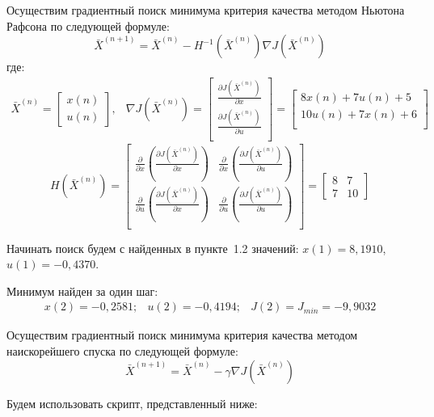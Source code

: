 \documentclass[14pt, a4paper]{extarticle}
\begin{document}
	Осуществим градиентный поиск минимума критерия качества методом Ньютона Рафсона по следующей формуле:
	$$\bar{X}^{(n+1)}=\bar{X}^{(n)}-H^{-1}(\bar{X}^{(n)})\nabla J(\bar{X}^{(n)})$$
	где:
	$$\begin{matrix}
		\bar{X}^{(n)} = 
		\left[\begin{matrix}
			x(n) \\ u(n)
		\end{matrix}\right], &
		\nabla J(\bar{X}^{(n)})= 
		\left[\begin{matrix}
			\frac{\partial J(\bar{X}^{(n)})}{\partial x} \\
			\frac{\partial J(\bar{X}^{(n)})}{\partial u} \\
		\end{matrix}\right] = 
		\left[\begin{matrix}
			8x(n)+7u(n)+5 \\
			10u(n)+7x(n)+6 \\
		\end{matrix}\right]
	\end{matrix}$$
	$$H(\bar{X}^{(n)})= 
	\left[\begin{matrix}
		\frac{\partial}{\partial x}\left(\frac{\partial J(\bar{X}^{(n)})}{\partial x}\right) &
		\frac{\partial}{\partial x}\left(\frac{\partial J(\bar{X}^{(n)})}{\partial u}\right) \\
		\frac{\partial}{\partial u}\left(\frac{\partial J(\bar{X}^{(n)})}{\partial x}\right) &
		\frac{\partial}{\partial u}\left(\frac{\partial J(\bar{X}^{(n)})}{\partial u}\right) \\
	\end{matrix}\right]=
	\left[\begin{matrix}
		8 & 7 \\ 7 & 10 
	\end{matrix}\right]$$
	
	Начинать поиск будем с найденных в пункте~1.2 значений: $x(1)=8,1910$, $u(1)=-0,4370$.
	
	Минимум найден за один шаг:
	$$\begin{matrix}
		x(2)=-0,2581; & u(2)=-0,4194; & J(2)=J_{min}=-9,9032
	\end{matrix}$$
	
	Осуществим градиентный поиск минимума критерия качества методом наискорейшего спуска по следующей формуле:
	$$\bar{X}^{(n+1)}=\bar{X}^{(n)}-\gamma\nabla J(\bar{X}^{(n)})$$
	
	Будем использовать скрипт, представленный ниже:
	\begin{small}
		
	\end{small}
	
\end{document}
